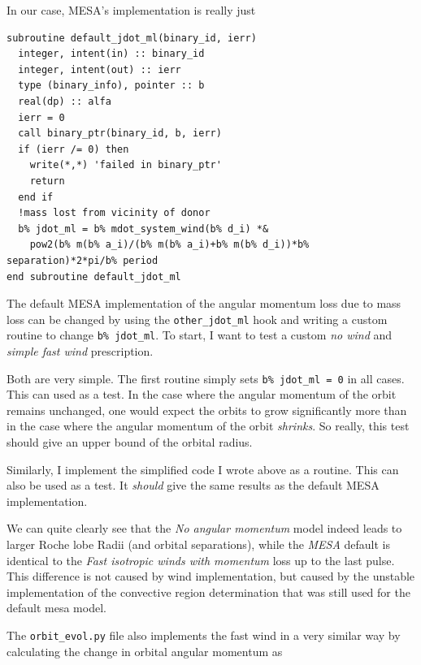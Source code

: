 \documentclass[a4paper,10pt]{article}
\begin{document}
In our case, MESA's implementation is really just
\begin{verbatim}
subroutine default_jdot_ml(binary_id, ierr)
  integer, intent(in) :: binary_id
  integer, intent(out) :: ierr
  type (binary_info), pointer :: b
  real(dp) :: alfa
  ierr = 0
  call binary_ptr(binary_id, b, ierr)
  if (ierr /= 0) then
    write(*,*) 'failed in binary_ptr'
    return
  end if
  !mass lost from vicinity of donor
  b% jdot_ml = b% mdot_system_wind(b% d_i) *&
    pow2(b% m(b% a_i)/(b% m(b% a_i)+b% m(b% d_i))*b% separation)*2*pi/b% period
end subroutine default_jdot_ml
\end{verbatim}

The default MESA implementation of the angular momentum loss due to mass loss can be changed by using the \lstinline[style=output, breaklines=true]|other_jdot_ml| hook and writing a custom routine to change \lstinline[style=output, breaklines=true]|b% jdot_ml|. To start, I want to test a custom \emph{no wind} and \emph{simple fast wind} prescription.

Both are very simple. The first routine simply sets \lstinline[style=output, breaklines=true]|b% jdot_ml = 0| in all cases. This can used as a test. In the case where the angular momentum of the orbit remains unchanged, one would expect the orbits to grow significantly more than in the case where the angular momentum of the orbit \emph{shrinks}. So really, this test should give an upper bound of the orbital radius.

Similarly, I implement the simplified code I wrote above as a routine. This can also be used as a test. It \emph{should} give the same results as the default MESA implementation.

\begin{figure}[ht]
    \centering
\end{figure}

We can quite clearly see that the \emph{No angular momentum} model indeed leads to larger Roche lobe Radii (and orbital separations), while the \emph{MESA} default is identical to the \emph{Fast isotropic winds with momentum} loss up to the last pulse. This difference is not caused by wind implementation, but caused by the unstable implementation of the convective region determination that was still used for the default mesa model.

The \lstinline[style=output, breaklines=true]|orbit_evol.py| file also implements the fast wind in a very similar way by calculating the change in orbital angular momentum as
\end{document}
